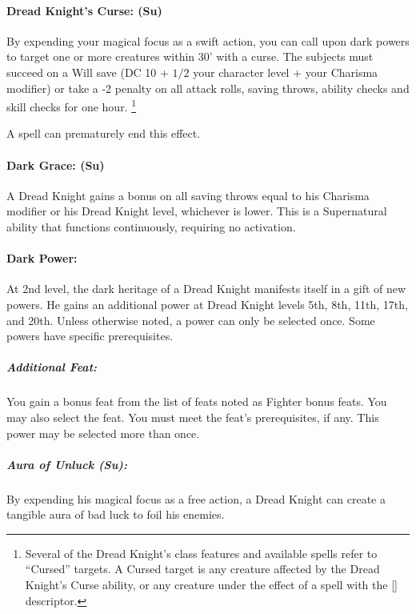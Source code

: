 \paragraph[Dread Knight's Curse]{Dread Knight's Curse: (Su)}
\label{sec:DreadKnightsCurse}
By expending your magical focus as a swift action, you can call upon dark powers to target one or more creatures within 30' with a curse.
The subjects must succeed on a Will save (DC 10 + $1/2$ your character level + your Charisma modifier) or take a -2 penalty on all attack rolls, saving throws, ability checks and skill checks for one hour.
\footnote{Several of the Dread Knight's class features and available spells refer to ``Cursed'' targets. A Cursed target is any creature affected by the Dread Knight's Curse ability, or any creature under the effect of a spell with the [] descriptor.}

A  spell can prematurely end this effect.

\paragraph{Dark Grace: (Su)} A Dread Knight gains a bonus on all saving throws equal to his Charisma modifier or his Dread Knight level, whichever is lower.
This is a Supernatural ability that functions continuously, requiring no activation.

\paragraph{Dark Power:}
At 2nd level, the dark heritage of a Dread Knight manifests itself in a gift of new powers. He gains an additional power at Dread Knight levels 5th, 8th, 11th, 17th, and 20th. Unless otherwise noted, a power can only be selected once. Some powers have specific prerequisites.

\subparagraph{Additional Feat:}
You gain a bonus feat from the list of feats noted as Fighter bonus feats. You may also select the  feat. You must meet the feat's prerequisites, if any.
This power may be selected more than once.

\subparagraph{Aura of Unluck (Su):} 
By expending his magical focus as a free action, a Dread Knight can create a tangible aura of bad luck to foil his enemies. 

